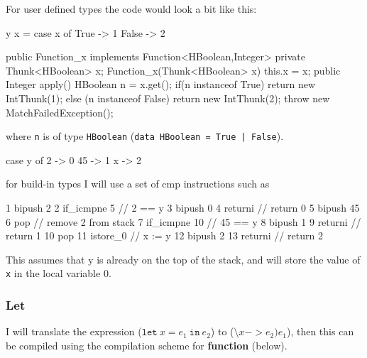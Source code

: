 \documentclass[12pt,a4paper,twoside]{article}
\begin{document}
For user defined types the code would look a bit like this:
\begin{HaskellLst}
y x = case x of
  True  -> 1
  False -> 2
\end{HaskellLst}
\begin{JavaLst}
public Function_x implements Function<HBoolean,Integer> {
  private Thunk<HBoolean> x;
  Function_x(Thunk<HBoolean> x) {this.x = x;}
  public Integer apply() {
    HBoolean n = x.get();
    if(n instanceof True) {
      return new IntThunk(1);
    } else (n instanceof False) {
      return new IntThunk(2);
    }
    throw new MatchFailedException();
  }
}
\end{JavaLst}
where \texttt{n} is of type \texttt{HBoolean} (\texttt{data HBoolean = True | False}).
\begin{HaskellLst}
case y of
  2  -> 0
  45 -> 1
  x  -> 2
\end{HaskellLst}
for build-in types I will use a set of cmp instructions such as
\begin{JVMLst}
1  bipush 2       
2  if_icmpne 5   // 2 == y
3  bipush 0      
4  returni       // return 0
5  bipush 45
6  pop           // remove 2 from stack
7  if_icmpne 10  // 45 == y
8  bipush 1    
9  returni       // return 1
10 pop
11 istore_0      // x := y
12 bipush 2      
13 returni       // return 2
\end{JVMLst}

This assumes that y is already on the top of the stack, and will store the value of \texttt{x} in the local
variable 0.

\subsubsection{Let} 

I will translate the expression ($\mathtt{let}\ x = e_1\ \mathtt{in}\ e_2$) to 
($\texttt{\textbackslash} x -> e_2)e_1$), then 
this can be compiled using the compilation scheme for \textbf{function} (below).
\end{document}
